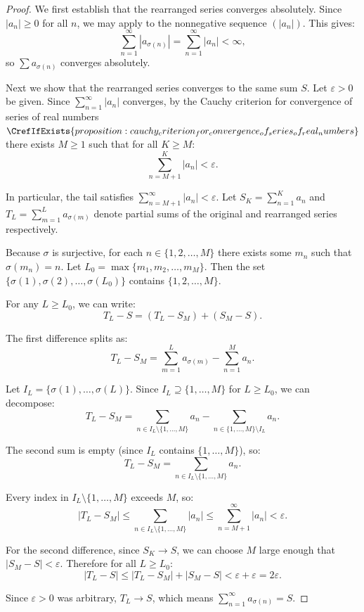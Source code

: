 \begin{proof}
    We first establish that the rearranged series converges absolutely. Since $|a_n| \geq 0$ for all $n$, we may apply  to the nonnegative sequence $(|a_n|)$. This gives:
    $$\sum_{n=1}^\infty |a_{\sigma(n)}| = \sum_{n=1}^\infty |a_n| < \infty,$$
    so $\sum a_{\sigma(n)}$ converges absolutely.

    Next we show that the rearranged series converges to the same sum $S$. Let $\varepsilon > 0$ be given. Since $\sum_{n=1}^\infty |a_n|$ converges, by the Cauchy criterion for convergence of series of real numbers$\CrefIfExists{proposition:cauchy_criterion_for_convergence_of_series_of_real_numbers}$ there exists $M \geq 1$ such that for all $K \geq M$:
    $$\sum_{n=M+1}^K |a_n| < \varepsilon.$$

    In particular, the tail satisfies $\sum_{n=M+1}^\infty |a_n| < \varepsilon$. Let $S_K = \sum_{n=1}^K a_n$ and $T_L = \sum_{m=1}^L a_{\sigma(m)}$ denote partial sums of the original and rearranged series respectively.

    Because $\sigma$ is surjective, for each $n \in \{1, 2, \dots, M\}$ there exists some $m_n$ such that $\sigma(m_n) = n$. Let $L_0 = \max\{m_1, m_2, \dots, m_M\}$. Then the set $\{\sigma(1), \sigma(2), \dots, \sigma(L_0)\}$ contains $\{1, 2, \dots, M\}$.

    For any $L \geq L_0$, we can write:
    $$T_L - S = (T_L - S_M) + (S_M - S).$$

    The first difference splits as:
    $$T_L - S_M = \sum_{m=1}^L a_{\sigma(m)} - \sum_{n=1}^M a_n.$$

    Let $I_L = \{\sigma(1), \dots, \sigma(L)\}$. Since $I_L \supseteq \{1, \dots, M\}$ for $L \geq L_0$, we can decompose:
    $$T_L - S_M = \sum_{n \in I_L \setminus \{1,\dots,M\}} a_n - \sum_{n \in \{1,\dots,M\} \setminus I_L} a_n.$$

    The second sum is empty (since $I_L$ contains $\{1, \dots, M\}$), so:
    $$T_L - S_M = \sum_{n \in I_L \setminus \{1,\dots,M\}} a_n.$$

    Every index in $I_L \setminus \{1, \dots, M\}$ exceeds $M$, so:
    $$|T_L - S_M| \leq \sum_{n \in I_L \setminus \{1,\dots,M\}} |a_n| \leq \sum_{n=M+1}^\infty |a_n| < \varepsilon.$$

    For the second difference, since $S_K \to S$, we can choose $M$ large enough that $|S_M - S| < \varepsilon$. Therefore for all $L \geq L_0$:
    $$|T_L - S| \leq |T_L - S_M| + |S_M - S| < \varepsilon + \varepsilon = 2\varepsilon.$$

    Since $\varepsilon > 0$ was arbitrary, $T_L \to S$, which means $\sum_{n=1}^\infty a_{\sigma(n)} = S$.
\end{proof}
